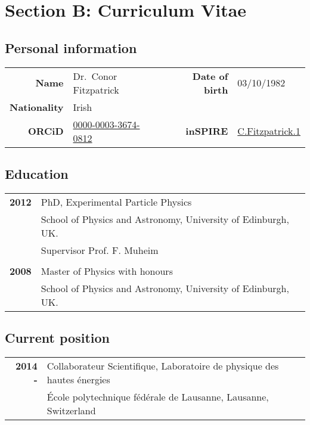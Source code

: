 
\section*{Section B: Curriculum Vitae} 
\subsection*{Personal information}
\begin{tabular}{rlrl}
{\bf Name} & Dr.~Conor Fitzpatrick & {\bf Date of birth} & 03/10/1982 \\
{\bf Nationality} & Irish \\
{\bf ORCiD} & \hyperlink{https://orcid.org/0000-0003-3674-0812}{0000-0003-3674-0812} & {\bf inSPIRE} & \hyperlink{https://inspirehep.net/author/profile/C.Fitzpatrick.1}{C.Fitzpatrick.1}

\end{tabular}
\subsection*{Education}
\begin{flushleft}
\begin{tabular}{rl}
\bf{2012} & PhD, Experimental Particle Physics \\ 
& School of Physics and Astronomy, University of Edinburgh, UK. \\ 
& Supervisor Prof. F. Muheim \\ \\
\bf{2008} & Master of Physics with honours \\ 
& School of Physics and Astronomy, University of Edinburgh, UK. \\ 
\end{tabular}
\end{flushleft}
\subsection*{Current position}
\begin{flushleft}
\begin{tabular}{rl}
\bf{2014 - \phantom{2014}} &  Collaborateur Scientifique, Laboratoire de physique des hautes \'energies\\ 
& \'Ecole polytechnique f\'ed\'erale de Lausanne, Lausanne, Switzerland
\end{tabular}
\end{flushleft}

